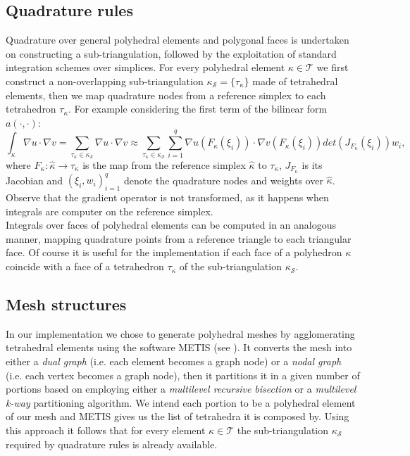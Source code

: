 \documentclass[12pt, a4paper]{article}
\theoremstyle{definition}
\theoremstyle{plain}
\theoremstyle{plain}
\theoremstyle{definition}
\begin{document}
\subsection{Quadrature rules}
Quadrature over general polyhedral elements and polygonal faces is undertaken 
on constructing a sub-triangulation, followed by the exploitation of 
standard integration schemes over simplices. For every polyhedral element $\kappa \in 
\mathcal{T}$ we first construct a non-overlapping sub-triangulation 
$\kappa_\mathcal{S} = \{\tau_\kappa\}$ made of tetrahedral elements, then we 
map quadrature nodes from a reference simplex to each tetrahedron 
$\tau_\kappa$. For example considering the first term of the bilinear form 
$a(\cdot, \cdot)$:
\begin{equation*}
	\int_\kappa \nabla u \cdot \nabla v = \sum_{\tau_\kappa \in \kappa_\mathcal{S}} \nabla u \cdot \nabla v \approx \sum_{\tau_\kappa \in \kappa_\mathcal{S}} \sum_{i=1}^{q} \nabla u(F_\kappa(\xi_i)) \cdot \nabla v(F_\kappa(\xi_i)) det(J_{F_\kappa}(\xi_i))w_i,
\end{equation*}
where $F_\kappa: \hat{\kappa} \rightarrow \tau_\kappa$ is the map from the 
reference simplex $\hat{\kappa}$ to $\tau_\kappa$, $J_{F_\kappa}$ is its 
Jacobian	and $(\xi_i, w_i)^q_{i=1}$ denote the quadrature nodes and weights 
over $\hat{\kappa}$. Observe that the gradient operator is not transformed, as 
it happens when integrals are computer on the reference simplex.\\
Integrals over faces of polyhedral elements can be computed in an analogous 
manner, mapping quadrature points from a reference triangle to each triangular 
face. Of course it is useful for the implementation if each face of a 
polyhedron $\kappa$ coincide with a face of a tetrahedron $\tau_\kappa$ of the 
sub-triangulation $\kappa_\mathcal{S}$.
\subsection{Mesh structures} \label{subsec:meshstructures}
In our implementation we chose to generate polyhedral meshes by agglomerating 
tetrahedral elements using the software 
METIS (see \cite{metis}). It 
converts the mesh into either a \textit{dual graph} (i.e. each element becomes 
a graph node) or a \textit{nodal graph} (i.e. each vertex becomes a graph 
node), then it partitions it in a given number of portions based on employing 
either a \textit{multilevel recursive bisection} or a \textit{multilevel k-way} 
partitioning algorithm. We intend each portion to be a polyhedral element of 
our mesh and METIS gives us the list of tetrahedra it is composed by. Using 
this approach it follows that for every element $\kappa \in \mathcal{T}$ the 
sub-triangulation $\kappa_\mathcal{S}$ required by quadrature rules is already 
available.
\newpage
\end{document}
